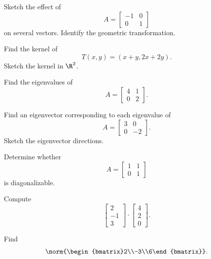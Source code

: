\begin{exercise}[2]
Sketch the effect of
\[ A=\begin{bmatrix}-1&0\\0&1\end{bmatrix} \]
on several vectors. Identify the geometric transformation.
\end{exercise}

\begin{exercise}[2]
Find the kernel of
\[ T(x,y)=(x+y,2x+2y). \]
Sketch the kernel in \(\R^2\).
\end{exercise}

\begin{exercise}[2]
Find the eigenvalues of
\[ A=\begin{bmatrix}4&1\\0&2\end{bmatrix}. \]
\end{exercise}

\begin{exercise}[2]
Find an eigenvector corresponding to each eigenvalue of
\[ A=\begin{bmatrix}3&0\\0&-2\end{bmatrix}. \]
Sketch the eigenvector directions.
\end{exercise}

\begin{exercise}[3]
Determine whether
\[ A=\begin{bmatrix}1&1\\0&1\end{bmatrix} \]
is diagonalizable.
\end{exercise}

\begin{exercise}[1]
Compute
\[ \begin{bmatrix}2\\-1\\3\end{bmatrix}
\cdot
\begin{bmatrix}4\\2\\0\end{bmatrix}. \]
\end{exercise}

\begin{exercise}[1]
Find
\[ \norm{\begin{bmatrix}2\\-3\\6\end{bmatrix}}. \]
\end{exercise}

